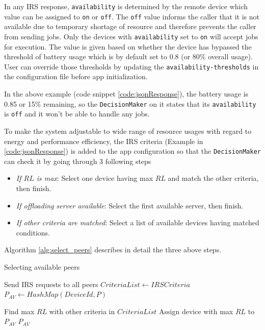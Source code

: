 \documentclass{sig-alternate}[10pt]
\begin{document}
\begin{CCSXML}
In any IRS response, \texttt{availability} is determined by the remote device which value can be assigned to \texttt{on} or \texttt{off}. The \texttt{off} value informs the caller that it is not available due to temporary shortage of resource and therefore prevents the caller from sending jobs. Only the devices with \texttt{availability} set to \texttt{on} will accept jobs for execution. The value is given based on whether the device has bypassed the threshold of battery usage which is by default set to 0.8 (or 80\% overall usage). User can override those thresholds by updating the \texttt{availability-thresholds} in the configuration file before app initialization. 

In the above example (code snippet \ref{code:jsonResponse}), the battery usage is 0.85 or 15\% remaining, so the \texttt{DecisionMaker} on it states that its \texttt{availability} is \texttt{off} and it won't be able to handle any jobs.

To make the system adjustable to wide range of resource usages with regard to energy and performance efficiency, the IRS criteria (Example in \ref{code:jsonResponse}) is added to the app configuration so that the \texttt{DecisionMaker} can check it by going through 3 following steps
\begin{itemize}
	\item \emph{If $RL$ is max}: Select one device having max $RL$ and match the other criteria, then finish.
	\item \emph{If offloading server available}: Select the first available server, then finish.
	\item \emph{If other criteria are matched}: Select a list of available devices having matched conditions.
\end{itemize}
Algorithm \ref{alg:select_peers} describes in detail the three above steps.

\begin{algorithm}

\caption{Selecting available peers}
\label{alg:select_peers}
\begin{algorithmic}[1] 
\begin{scriptsize}
\State Send IRS requests to all peers 
\State $CriteriaList \leftarrow IRSCriteria$
\State $P_{AV} \leftarrow HashMap(DeviceId, P)$

  	\State Find max $RL$ with other criteria in $CriteriaList$
		\State Assign device with max $RL$ to $P_{AV}$
  	\State \Return $P_{AV}$
  \EndFor
\EndIf


\end{scriptsize}
\end{algorithmic}
\end{algorithm}
\end{CCSXML}
\end{document}
